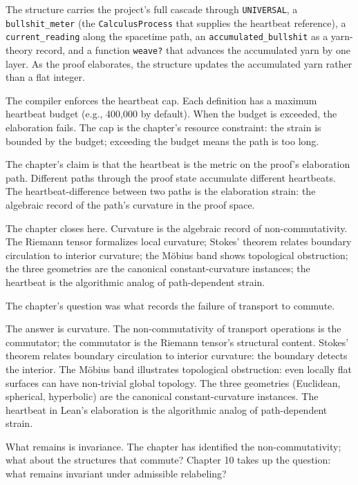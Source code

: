 The structure carries the project's full cascade through
\texttt{UNIVERSAL}, a \texttt{bullshit\_meter} (the
\texttt{CalculusProcess} that supplies the heartbeat reference), a
\texttt{current\_reading} along the spacetime path, an
\texttt{accumulated\_bullshit} as a yarn-theory record, and a
function \texttt{weave?} that advances the accumulated yarn by one
layer. As the proof elaborates, the structure updates the
accumulated yarn rather than a flat integer.

The compiler enforces the heartbeat cap. Each definition has a
maximum heartbeat budget (e.g., 400,000 by default). When the
budget is exceeded, the elaboration fails. The cap is the
chapter's resource constraint: the strain is bounded by the
budget; exceeding the budget means the path is too long.

The chapter's claim is that the heartbeat is the
metric on the proof's elaboration path. Different paths through
the proof state accumulate different heartbeats. The
heartbeat-difference between two paths is the elaboration
strain: the algebraic record of the path's curvature in the
proof space.

The chapter closes here. Curvature is the algebraic record of
non-commutativity. The Riemann tensor formalizes local
curvature; Stokes' theorem relates boundary circulation to
interior curvature; the M\"obius band shows topological
obstruction; the three geometries are the canonical
constant-curvature instances; the heartbeat is the
algorithmic analog of path-dependent strain.

\begin{bridge}

The chapter's question was what records the failure of transport to
commute.

The answer is curvature. The non-commutativity of transport
operations is the commutator; the commutator is the Riemann
tensor's structural content. Stokes' theorem relates boundary
circulation to interior curvature: the boundary detects the
interior. The M\"obius band illustrates topological
obstruction: even locally flat surfaces can have non-trivial
global topology. The three geometries (Euclidean, spherical,
hyperbolic) are the canonical constant-curvature instances.
The heartbeat in Lean's elaboration is the algorithmic
analog of path-dependent strain.

What remains is invariance. The chapter has identified the
non-commutativity; what about the structures that commute?
Chapter 10 takes up the question: what remains invariant
under admissible relabeling?

\end{bridge}

